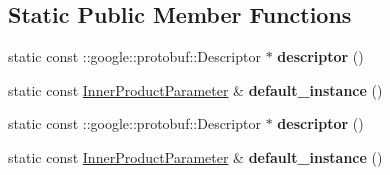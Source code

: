\subsection*{Static Public Member Functions}
\begin{DoxyCompactItemize}
\item 
\mbox{\label{classcaffe_1_1_inner_product_parameter_aee290aa40c046491116524d209825ae6}} 
static const \+::google\+::protobuf\+::\+Descriptor $\ast$ {\bfseries descriptor} ()
\item 
\mbox{\label{classcaffe_1_1_inner_product_parameter_ae08a9ebb8f6da93a0d4a424a6af78867}} 
static const \mbox{\hyperlink{classcaffe_1_1_inner_product_parameter}{Inner\+Product\+Parameter}} \& {\bfseries default\+\_\+instance} ()
\item 
\mbox{\label{classcaffe_1_1_inner_product_parameter_a9060d4ee0902139a9e894a9b94fa228b}} 
static const \+::google\+::protobuf\+::\+Descriptor $\ast$ {\bfseries descriptor} ()
\item 
\mbox{\label{classcaffe_1_1_inner_product_parameter_a016e7fc424d798ca9069412885f68931}} 
static const \mbox{\hyperlink{classcaffe_1_1_inner_product_parameter}{Inner\+Product\+Parameter}} \& {\bfseries default\+\_\+instance} ()
\end{DoxyCompactItemize}

